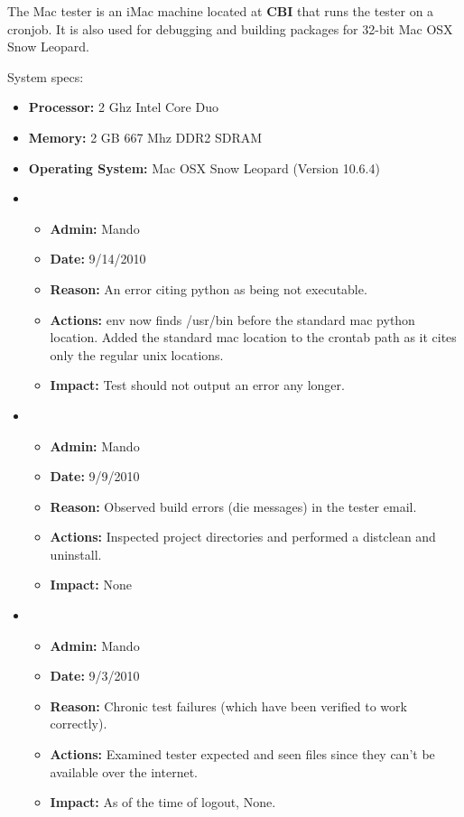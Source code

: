 \documentclass[12pt]{article}
\begin{document}
The Mac tester is an iMac machine located at {\bf CBI} that runs the tester on a cronjob. It is also used for debugging and building packages for 32-bit Mac OSX Snow Leopard.

System specs:
\begin{itemize}
\item[] {\bf Processor:} 2 Ghz Intel Core Duo
\item[] {\bf Memory:} 2 GB 667 Mhz DDR2 SDRAM
\item[] {\bf Operating System:} Mac OSX Snow Leopard (Version 10.6.4) 
\end{itemize}

\begin{itemize}

\item 
\begin{itemize}
\item[] {\bf Admin:} Mando
\item[] {\bf Date:} 9/14/2010
\item[] {\bf Reason:} An error citing python as being not executable. 
\item[] {\bf Actions:} env now finds /usr/bin before the standard mac python location. Added the standard mac location to the crontab path as it cites only the regular unix locations.
\item[] {\bf Impact:} Test should not output an error any longer.
\end{itemize}
	
\item 
\begin{itemize}
\item[] {\bf Admin:} Mando
\item[] {\bf Date:} 9/9/2010
\item[] {\bf Reason:} Observed build errors (die messages) in the tester email. 
\item[] {\bf Actions:} Inspected project directories and performed a distclean and uninstall.
\item[] {\bf Impact:} None
\end{itemize}

\item 
\begin{itemize}
\item[] {\bf Admin:} Mando
\item[] {\bf Date:} 9/3/2010
\item[] {\bf Reason:} Chronic test failures (which have been verified to work correctly). 
\item[] {\bf Actions:} Examined tester expected and seen files since they can't be available over the internet.
\item[] {\bf Impact:} As of the time of logout, None.
\end{itemize}
	

\end{itemize}
\end{document}
